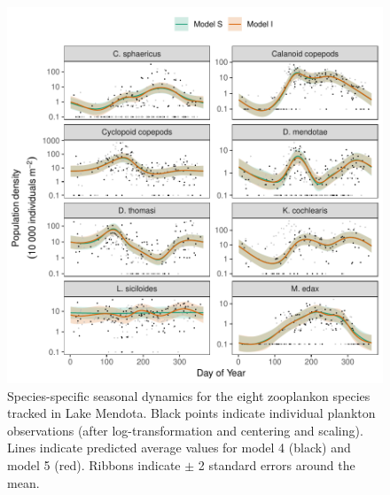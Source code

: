 \documentclass[12pt]{article}
\begin{document}
\begin{figure}
\centering
\includegraphics{../figures/zoo_comm_plot-1.pdf}
\caption{\label{fig:zoo_comp}Species-specific seasonal dynamics for the
eight zooplankon species tracked in Lake Mendota. Black points indicate
individual plankton observations (after log-transformation and centering
and scaling). Lines indicate predicted average values for model 4
(black) and model 5 (red). Ribbons indicate \(\pm\) 2 standard errors
around the mean.}
\end{figure}
\end{document}
